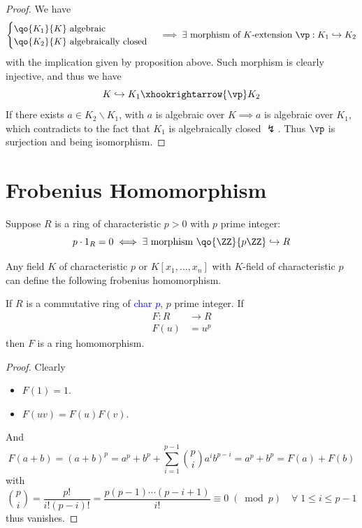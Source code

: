 \begin{proof}
	We have
	\[
		\begin{cases}
			\qo{K_1}{K} \text{ algebraic} \\
			\qo{K_2}{K} \text{ algebraically closed}
		\end{cases}
		\implies \exists \text{ morphism of } K \text{-extension } \vp: K_1 \hookrightarrow K_2
	\]
	with the implication given by proposition above. Such morphism is clearly injective, and thus we have
	\[
		K\hookrightarrow K_1 \xhookrightarrow{\vp} K_2
	\]
	If there exists \( a \in K_2 \smallsetminus K_1 \), with \( a \) is algebraic over \( K \implies a \)
	is algebraic over \( K_1 \), which contradicts to the fact that \( K_1 \) is algebraically closed
	\( \lightning \).
	Thus \( \vp \) is surjection and being isomorphism.
\end{proof}

\section{Frobenius Homomorphism}
Suppose \( R \) is a ring of characteristic \( p > 0 \) with \( p \) prime integer:
\[
	p \cdot 1_R = 0 \iff \exists \text{ morphism } \qo{\ZZ}{p\ZZ} \hookrightarrow R
\]

\begin{eg}
	Any field \( K \) of characteristic \( p \) or \( K[x_1,\ldots,x_n] \) with \( K \)-field of
	characteristic \( p \) can define the following frobenius homomorphism.
\end{eg}

\begin{proposition}
	\label{prop:frobenius-hom}
	If \( R \) is a commutative ring of \textcolor{blue}{char \( p \)}, \( p \) prime integer. If
	\[
		\begin{aligned}
			F: R & \to R \\
			F(u) & = u^p
		\end{aligned}
	\]
	then \( F \) is a ring homomorphism.
\end{proposition}

\begin{proof}
	Clearly
	\begin{itemize}
		\item \( F(1) = 1 \).
		\item \( F(uv) = F(u)F(v) \).
	\end{itemize}
	And
	\[
		F(a+b) = (a+b)^p = a^p + b^p +\sum_{i=1}^{p-1}\binom{p}{i} a^i b^{p-i} = a^p + b^p = F(a) + F(b)
	\]
	with
	\[
		\binom{p}{i} = \frac{p!}{i!(p-i)!} = \frac{p(p-1)\cdots(p-i+1)}{i!} \equiv 0 \; (\bmod{p}) \quad
		\forall \; 1
		\leq i \leq p-1
	\]
	thus vanishes.
\end{proof}

